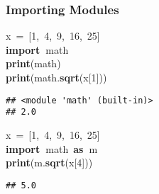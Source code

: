\documentclass{beamer}\usepackage[]{graphicx}\usepackage[]{color}
\makeatletter
\newcommand{\hlnum}[1]{\textcolor[rgb]{0.686,0.059,0.569}{#1}}%
\newcommand{\hlopt}[1]{\textcolor[rgb]{0,0,0}{#1}}%
\newcommand{\hlstd}[1]{\textcolor[rgb]{0.345,0.345,0.345}{#1}}%
\newcommand{\hlkwa}[1]{\textcolor[rgb]{0.161,0.373,0.58}{\textbf{#1}}}%
\newcommand{\hlkwd}[1]{\textcolor[rgb]{0.737,0.353,0.396}{\textbf{#1}}}%
\newenvironment{kframe}{%
 \def\at@end@of@kframe{}%
 \ifinner\ifhmode%
  \def\at@end@of@kframe{\end{minipage}}%
  \begin{minipage}{\columnwidth}%
 \fi\fi%
 \def\FrameCommand##1{\hskip\@totalleftmargin \hskip-\fboxsep
 \colorbox{shadecolor}{##1}\hskip-\fboxsep
     \hskip-\linewidth \hskip-\@totalleftmargin \hskip\columnwidth}%
 \MakeFramed {\advance\hsize-\width
   \@totalleftmargin\z@ \linewidth\hsize
   \@setminipage}}%
 {\par\unskip\endMakeFramed%
 \at@end@of@kframe}
\newenvironment{knitrout}{}{} %
\makeatother
\begin{document}
\begin{frame}[fragile]
\frametitle{Importing Modules}
\begin{knitrout}
\color{fgcolor}\begin{kframe}
\noindent
\ttfamily
\hlstd{x\ }\hlopt{=\ {[}}\hlstd{}\hlnum{1}\hlstd{}\hlopt{,\ }\hlstd{}\hlnum{4}\hlstd{}\hlopt{,\ }\hlstd{}\hlnum{9}\hlstd{}\hlopt{,\ }\hlstd{}\hlnum{16}\hlstd{}\hlopt{,\ }\hlstd{}\hlnum{25}\hlstd{}\hlopt{{]}}\hspace*{\fill}\\
\hlstd{}\hlkwa{import\ }\hlstd{math\ }\hspace*{\fill}\\
\hlstd{}\hlkwa{print}\hlstd{}\hlopt{(}\hlstd{math}\hlopt{)}\hspace*{\fill}\\
\hlstd{}\hlkwa{print}\hlstd{}\hlopt{(}\hlstd{math}\hlopt{.}\hlstd{}\hlkwd{sqrt}\hlstd{}\hlopt{(}\hlstd{x}\hlopt{{[}}\hlstd{}\hlnum{1}\hlstd{}\hlopt{{]}))}\hlstd{}\hspace*{\fill}
\mbox{}
\normalfont

\begin{verbatim}
## <module 'math' (built-in)>
## 2.0
\end{verbatim}
\end{kframe}
\end{knitrout}

\begin{knitrout}
\color{fgcolor}\begin{kframe}
\noindent
\ttfamily
\hlstd{x\ }\hlopt{=\ {[}}\hlstd{}\hlnum{1}\hlstd{}\hlopt{,\ }\hlstd{}\hlnum{4}\hlstd{}\hlopt{,\ }\hlstd{}\hlnum{9}\hlstd{}\hlopt{,\ }\hlstd{}\hlnum{16}\hlstd{}\hlopt{,\ }\hlstd{}\hlnum{25}\hlstd{}\hlopt{{]}}\hspace*{\fill}\\
\hlstd{}\hlkwa{import\ }\hlstd{math\ }\hlkwa{as\ }\hlstd{m\ }\hspace*{\fill}\\
\hlstd{}\hlkwa{print}\hlstd{}\hlopt{(}\hlstd{m}\hlopt{.}\hlstd{}\hlkwd{sqrt}\hlstd{}\hlopt{(}\hlstd{x}\hlopt{{[}}\hlstd{}\hlnum{4}\hlstd{}\hlopt{{]}))}\hlstd{}\hspace*{\fill}
\mbox{}
\normalfont

\begin{verbatim}
## 5.0
\end{verbatim}
\end{kframe}
\end{knitrout}
\end{frame}
\end{document}
